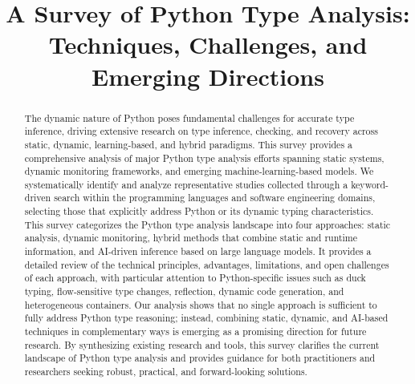 \documentclass[conference]{IEEEtran}
\begin{document}
  \title{A Survey of Python Type Analysis: Techniques, Challenges, and Emerging Directions}

  \author{
  \and
  }

  \maketitle

  \begin{abstract}
    The dynamic nature of Python poses fundamental challenges for accurate type
    inference, driving extensive research on type inference, checking, and
    recovery across static, dynamic, learning-based, and hybrid paradigms.
    This survey provides a comprehensive analysis of major Python type analysis
    efforts spanning static systems, dynamic monitoring frameworks, and
    emerging machine-learning-based models.
    We systematically identify and analyze representative studies collected
    through a keyword-driven search within the programming languages and
    software engineering domains, selecting those that explicitly address
    Python or its dynamic typing characteristics.
    This survey categorizes the Python type analysis landscape into four
    approaches: static analysis, dynamic monitoring, hybrid methods that
    combine static and runtime information, and AI-driven inference based on
    large language models.
    It provides a detailed review of the technical principles, advantages,
    limitations, and open challenges of each approach, with particular
    attention to Python-specific issues such as duck typing, flow-sensitive
    type changes, reflection, dynamic code generation, and heterogeneous
    containers.
    Our analysis shows that no single approach is sufficient to fully address
    Python type reasoning; instead, combining static, dynamic, and AI-based
    techniques in complementary ways is emerging as a promising direction for
    future research.
    By synthesizing existing research and tools, this survey clarifies the
    current landscape of Python type analysis and provides guidance for both
    practitioners and researchers seeking robust, practical, and
    forward-looking solutions.
  \end{abstract}
\end{document}
